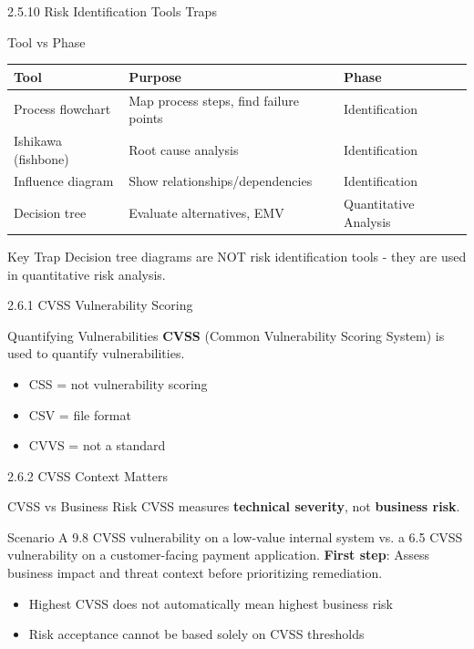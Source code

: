 \documentclass{beamer}
\begin{document}
	\begin{frame}{2.5.10 Risk Identification Tools Traps}
		\begin{block}{Tool vs Phase}
			\begin{tabular}{|p{4cm}|p{5cm}|p{3cm}|}
				\hline
				\textbf{Tool} & \textbf{Purpose} & \textbf{Phase} \\
				\hline
				Process flowchart & Map process steps, find failure points & Identification \\
				\hline
				Ishikawa (fishbone) & Root cause analysis & Identification \\
				\hline
				Influence diagram & Show relationships/dependencies & Identification \\
				\hline
				Decision tree & Evaluate alternatives, EMV & Quantitative Analysis \\
				\hline
			\end{tabular}
		\end{block}
		\begin{alertblock}{Key Trap}
			Decision tree diagrams are NOT risk identification tools - they are used in quantitative risk analysis.
		\end{alertblock}
	\end{frame}
	
	\begin{frame}{2.6.1 CVSS Vulnerability Scoring}
		\begin{block}{Quantifying Vulnerabilities}
			\textbf{CVSS} (Common Vulnerability Scoring System) is used to quantify vulnerabilities.
		\end{block}
		\begin{itemize}
			\item CSS = not vulnerability scoring
			\item CSV = file format
			\item CVVS = not a standard
		\end{itemize}
	\end{frame}
	
	\begin{frame}{2.6.2 CVSS Context Matters}
		\begin{block}{CVSS vs Business Risk}
			CVSS measures \textbf{technical severity}, not \textbf{business risk}.
		\end{block}
		\begin{exampleblock}{Scenario}
			A 9.8 CVSS vulnerability on a low-value internal system vs. a 6.5 CVSS vulnerability on a customer-facing payment application.
			\textbf{First step}: Assess business impact and threat context before prioritizing remediation.
		\end{exampleblock}
		\begin{itemize}
			\item Highest CVSS does not automatically mean highest business risk
			\item Risk acceptance cannot be based solely on CVSS thresholds
		\end{itemize}
	\end{frame}
	
\end{document}
